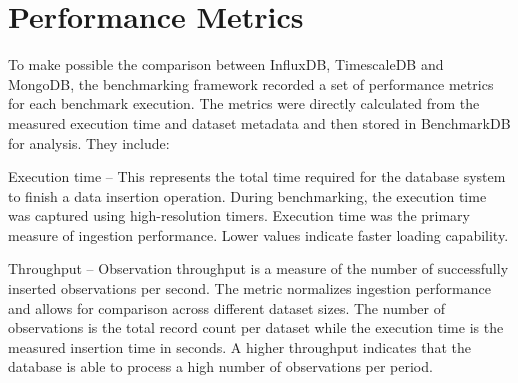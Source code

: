 \section{Performance Metrics}
To make possible the comparison between InfluxDB, TimescaleDB and MongoDB, the benchmarking framework recorded a set of performance metrics for each benchmark execution. The metrics were directly calculated from the measured execution time and dataset metadata and then stored in BenchmarkDB for analysis. They include:

Execution time – This represents the total time required for the database system to finish a data insertion operation. During benchmarking, the execution time was captured using high-resolution timers. Execution time was the primary measure of ingestion performance. Lower values indicate faster loading capability. 


Throughput – Observation throughput is a measure of the number of successfully inserted observations per second. The metric normalizes ingestion performance and allows for comparison across different dataset sizes. The number of observations is the total record count per dataset while the execution time is the measured insertion time in seconds. A higher throughput indicates that the database is able to process a high number of observations per period. 



% 